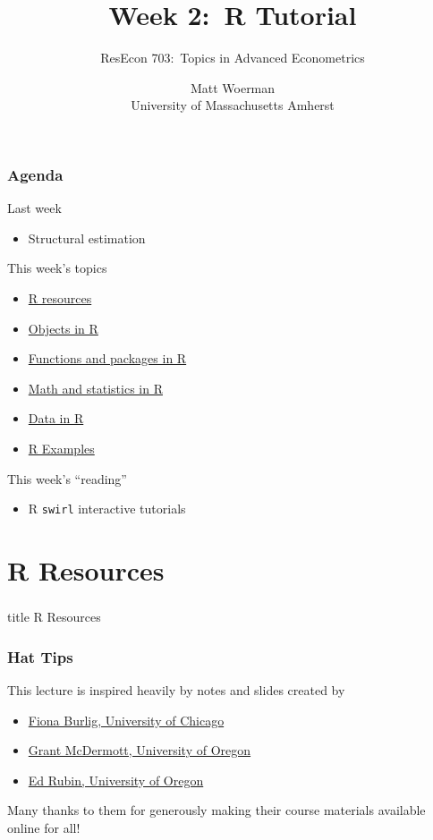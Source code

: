 \documentclass{beamer}
\title[Week 2:\ R Tutorial]{Week 2:\ R Tutorial}
\author[ResEcon 703:\ Advanced Econometrics]{ResEcon 703:\ Topics in Advanced Econometrics}
\date{Matt Woerman\\University of Massachusetts Amherst}
\begin{document}
{ 
\begin{frame}[noframenumbering]
    \titlepage
\end{frame}
}

\begin{frame}\frametitle{Agenda}
    Last week
    \begin{itemize}
        \item Structural estimation
    \end{itemize}
    \vspace{2ex}
    This week's topics
    \begin{itemize}
    	\item \hyperlink{page.\getpagerefnumber{resources}}{R resources}
        \item \hyperlink{page.\getpagerefnumber{objects}}{Objects in R}
        \item \hyperlink{page.\getpagerefnumber{functions}}{Functions and packages in R}
        \item \hyperlink{page.\getpagerefnumber{math}}{Math and statistics in R}
        \item \hyperlink{page.\getpagerefnumber{data}}{Data in R}
        \item \hyperlink{page.\getpagerefnumber{examples}}{R Examples}
    \end{itemize}
    \vspace{2ex}
    This week's ``reading''
    \begin{itemize}
        \item R \texttt{swirl} interactive tutorials
    \end{itemize}
\end{frame}

\section{R Resources}
\label{resources}
\begin{frame}\frametitle{}
    \vfill
    \centering
    \begin{beamercolorbox}[center]{title}
        \Large R Resources
    \end{beamercolorbox}
    \vfill
\end{frame}

\begin{frame}\frametitle{Hat Tips}
    This lecture is inspired heavily by notes and slides created by
    \begin{itemize}
        \item \href{https://www.fionaburlig.com/}{Fiona Burlig, University of Chicago}
        \item \href{https://grantmcdermott.com/}{Grant McDermott, University of Oregon}
        \item \href{http://edrub.in/}{Ed Rubin, University of Oregon}
    \end{itemize}
    \vspace{3ex}
    Many thanks to them for generously making their course materials available online for all!
\end{frame}
\end{document}

